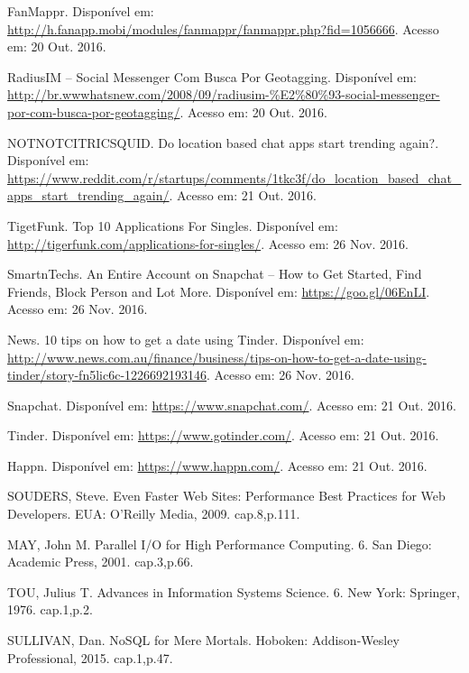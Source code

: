 \documentclass[brazil,ruledheader]{abntifes}
\begin{document}
\begin{thebibliography}{9}
		FanMappr. Disponível em: \url{http://h.fanapp.mobi/modules/fanmappr/fanmappr.php?fid=1056666}.
		Acesso em: 20 Out. 2016.
		
		RadiusIM – Social Messenger Com Busca Por Geotagging. Disponível em: \url{http://br.wwwhatsnew.com/2008/09/radiusim-%E2%80%93-social-messenger-por-com-busca-por-geotagging/}.
			Acesso em: 20 Out. 2016.
			
		NOTNOTCITRICSQUID. Do location based chat apps start trending again?. Disponível em: \url{https://www.reddit.com/r/startups/comments/1tkc3f/do_location_based_chat_apps_start_trending_again/}.
		Acesso em: 21 Out. 2016.
		
		TigetFunk. Top 10 Applications For Singles. Disponível em: \url{http://tigerfunk.com/applications-for-singles/}.
		Acesso em: 26 Nov. 2016.
		
		SmartnTechs. An Entire Account on Snapchat – How to Get Started, Find Friends, Block Person and Lot More. Disponível em: 
		\url{https://goo.gl/06EnLI}.
		Acesso em: 26 Nov. 2016.
		
		News. 10 tips on how to get a date using Tinder. Disponível em: \url{http://www.news.com.au/finance/business/tips-on-how-to-get-a-date-using-tinder/story-fn5lic6c-1226692193146}.
		Acesso em: 26 Nov. 2016.
		
		Snapchat. Disponível em: \url{https://www.snapchat.com/}.
		Acesso em: 21 Out. 2016.
		
		Tinder. Disponível em: \url{https://www.gotinder.com/}.
		Acesso em: 21 Out. 2016.
		
		Happn. Disponível em: \url{https://www.happn.com/}.
		Acesso em: 21 Out. 2016.
		
		SOUDERS, Steve. Even Faster Web Sites: Performance Best Practices for Web Developers. EUA: O'Reilly Media,
		2009. cap.8,p.111.
		
		MAY, John M. Parallel I/O for High Performance Computing. 6. San Diego: Academic Press,
		2001. cap.3,p.66.
		
		TOU, Julius T. Advances in Information Systems Science. 6. New York: Springer,
		1976. cap.1,p.2.
		
		SULLIVAN, Dan. NoSQL for Mere Mortals. Hoboken: Addison-Wesley Professional, 2015. cap.1,p.47.
		

\end{thebibliography}
\end{document}

